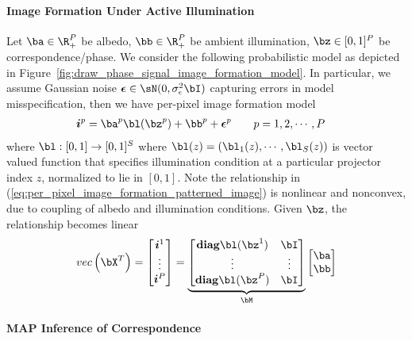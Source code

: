 \documentclass[../writeup.tex]{subfiles}
\begin{document}
\paragraph{Image Formation Under Active Illumination}

Let $\ba \in \R_+^{P}$ be albedo, $\bb\in\R_+^P$ be ambient illumination, $\bz\in[0,1]^{P}$ be correspondence/phase. We consider the following probabilistic model as depicted in Figure~\ref{fig:draw_phase_signal_image_formation_model}. In particular, we assume Gaussian noise $\bepsilon\in\sN(0,\sigma^2_{\epsilon}\bI)$ capturing errors in model misspecification, then we have per-pixel image formation model
\begin{align}
    \si^p
        &= \ba^p \bl(\bz^p) + \bb^p + \bepsilon^p
        \qquad
        p = 1,2,\cdots,P
    \label{eq:per_pixel_image_formation_patterned_image}
\end{align}
where $\bl:[0,1]\to [0,1]^S$ where $\bl(z) = (\bl_1(z),\cdots,\bl_S(z))$ is vector valued function that specifies illumination condition at a particular projector index $z$, normalized to lie in $[0,1]$. Note the relationship in (\ref{eq:per_pixel_image_formation_patterned_image}) is nonlinear and nonconvex, due to coupling of albedo and illumination conditions. Given $\bz$, the relationship becomes linear
\begin{align}
    \vec{\bX^T}
        =
    \begin{bmatrix}
        \si^1 \\
        \vdots \\
        \si^P \\
    \end{bmatrix}
        =
        \underbrace{
            \begin{bmatrix}
                \diag \bl(\bz^1) & \bI \\ 
                \vdots & \vdots \\ 
                \diag \bl(\bz^P) & \bI \\
            \end{bmatrix}
        }_{\bM}
        \begin{bmatrix}
            \ba \\ \bb 
        \end{bmatrix}
    \label{eq:per_pixel_image_formation_patterned_image_given_correspondence}
\end{align}

\paragraph{MAP Inference of Correspondence}
\end{document}
